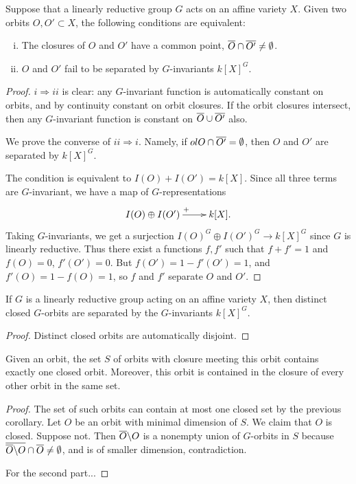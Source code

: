 \documentclass[11pt, english]{article}
\begin{document}
\begin{thm}
  Suppose that a linearly reductive group $G$ acts on an affine variety $X$. Given two orbits $O,O' \subset X$, the following conditions are equivalent:
  \begin{enumerate}[i)]
  \item The closures of $O$ and $O'$ have a common point, $\overline{O} \cap \overline{O'} \neq \emptyset$.
\item $O$ and $O'$ fail to be separated by $G$-invariants $k[X]^G$.
  \end{enumerate}
\end{thm}
\begin{proof}
  $i \Rightarrow ii$ is clear: any $G$-invariant function is automatically constant on orbits, and by continuity constant on orbit closures. If the orbit closures intersect, then any $G$-invariant function is constant on $\overline{O} \cup \overline{O'}$ also.

We prove the converse  of $ii \Rightarrow i$. Namely, if $ol{O} \cap \overline{O'}=\emptyset$, then $O$ and $O'$ are separated by $k[X]^G$.

The condition is equivalent to $I(O) + I(O')=k[X]$. Since all three terms are $G$-invariant, we have a map of $G$-representations
\[
\xymatrix{
I(O) \oplus I(O') \ar[r]^{+} & k[X].
}
\]
Taking $G$-invariants, we get a surjection $I(O)^G \oplus I(O')^G \to k[X]^G$ since $G$ is linearly reductive. Thus there exist a functions $f,f'$ such that $f+f'=1$ and $f(O)=0$, $f'(O')=0$. But $f(O')=1-f'(O')=1$, and $f'(O)=1-f(O)=1$, so $f$ and $f'$ separate $O$ and $O'$.
\end{proof}

\begin{corr}
If $G$ is a linearly reductive group acting on an affine variety $X$, then distinct closed $G$-orbits are separated by the $G$-invariants $k[X]^G$.
\end{corr}
\begin{proof}
Distinct closed orbits are automatically disjoint.
\end{proof}

\begin{corr}
Given an orbit, the set $S$ of orbits with closure meeting this orbit contains exactly one closed orbit. Moreover, this orbit is contained in the closure of every other orbit in the same set.
\end{corr}
\begin{proof}
The set of such orbits can contain at most one closed set by the previous corollary. Let $O$ be an orbit with minimal dimension of $S$. We claim that $O$ is closed. Suppose not. Then $\overline{O} \backslash O$ is a nonempty union of $G$-orbits in $S$ because $\overline{\overline{O} \backslash O} \cap \overline{O} \neq \emptyset$, and is of smaller dimension, contradiction.

For the second part...
\end{proof}
\end{document}
